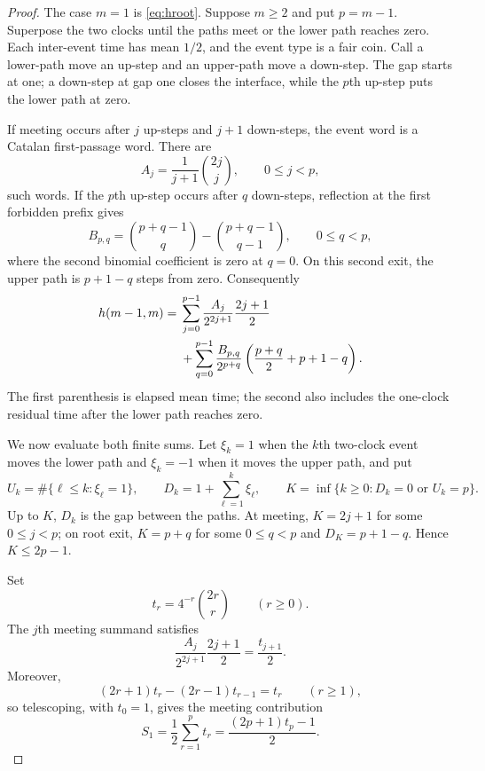 \begin{proof}
The case $m=1$ is \eqref{eq:hroot}.  Suppose $m\geq2$ and put $p=m-1$.
Superpose the two clocks until the paths meet or the lower path reaches zero.
Each inter-event time has mean $1/2$, and the event type is a fair coin.
Call a lower-path move an up-step and an upper-path move a down-step.  The
gap starts at one; a down-step at gap one closes the interface, while the
$p$th up-step puts the lower path at zero.

If meeting occurs after $j$ up-steps and $j+1$ down-steps, the event word is
a Catalan first-passage word.  There are
\[
 A_j=\frac{1}{j+1}\binom{2j}{j},\qquad 0\leq j<p,
\]
such words.  If the $p$th up-step occurs after $q$ down-steps, reflection at
the first forbidden prefix gives
\[
 B_{p,q}=\binom{p+q-1}{q}-\binom{p+q-1}{q-1},
 \qquad 0\leq q<p,                                    \label{eq:ballotcount}
\]
where the second binomial coefficient is zero at $q=0$.  On this second
exit, the upper path is $p+1-q$ steps from zero.  Consequently
\begin{align}
 h(m-1,m)
={}&\sum_{j=0}^{p-1}
 \frac{A_j}{2^{2j+1}}\frac{2j+1}{2} \notag\\
 &+\sum_{q=0}^{p-1}\frac{B_{p,q}}{2^{p+q}}
 \left(\frac{p+q}{2}+p+1-q\right).                    \label{eq:ballotsum}
\end{align}
The first parenthesis is elapsed mean time; the second also includes the
one-clock residual time after the lower path reaches zero.

We now evaluate both finite sums.  Let $\xi_k=1$ when the $k$th two-clock
event moves the lower path and $\xi_k=-1$ when it moves the upper path, and
put
\[
 U_k=\#\{\ell\leq k:\xi_\ell=1\},\qquad
 D_k=1+\sum_{\ell=1}^k\xi_\ell,
 \qquad
 K=\inf\{k\geq0:D_k=0\text{ or }U_k=p\}.
\]
Up to $K$, $D_k$ is the gap between the paths.  At meeting,
$K=2j+1$ for some $0\leq j<p$; on root exit, $K=p+q$ for some
$0\leq q<p$ and $D_K=p+1-q$.  Hence $K\leq2p-1$.

Set
\[
                   t_r=4^{-r}\binom{2r}{r}\qquad(r\geq0).
\]
The $j$th meeting summand satisfies
\[
 \frac{A_j}{2^{2j+1}}\frac{2j+1}{2}=\frac{t_{j+1}}2.
\]
Moreover,
\[
 (2r+1)t_r-(2r-1)t_{r-1}=t_r\qquad(r\geq1),
\]
so telescoping, with $t_0=1$, gives the meeting contribution
\begin{equation}
 S_1=\frac12\sum_{r=1}^{p}t_r
    =\frac{(2p+1)t_p-1}{2}.                            \label{eq:Sone}
\end{equation}


\end{proof}
